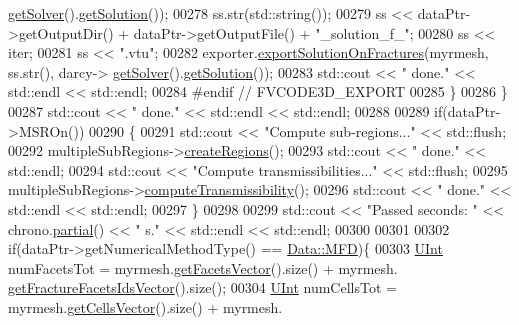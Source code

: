 \begin{DoxyCode}
      \hyperlink{classFVCode3D_1_1Problem_a39e64d24161ea699046d4e670fbc4eab}{getSolver}().\hyperlink{classFVCode3D_1_1Solver_a461d049e52ffc237cce3447c82860d3c}{getSolution}());
00278             ss.str(std::string());
00279             ss << dataPtr->getOutputDir() + dataPtr->getOutputFile() + \textcolor{stringliteral}{"\_solution\_f\_"};
00280             ss << iter;
00281             ss << \textcolor{stringliteral}{".vtu"};
00282             exporter.\hyperlink{classFVCode3D_1_1ExporterVTU_abc88a5113c02b55942862ef39b30ec80}{exportSolutionOnFractures}(myrmesh, ss.str(), darcy->
      \hyperlink{classFVCode3D_1_1Problem_a39e64d24161ea699046d4e670fbc4eab}{getSolver}().\hyperlink{classFVCode3D_1_1Solver_a461d049e52ffc237cce3447c82860d3c}{getSolution}());
00283             std::cout << \textcolor{stringliteral}{"  done."} << std::endl << std::endl;
00284 \textcolor{preprocessor}{#endif // FVCODE3D\_EXPORT}
00285         \}
00286     \}
00287     std::cout << \textcolor{stringliteral}{" done."} << std::endl << std::endl;
00288 
00289     \textcolor{keywordflow}{if}(dataPtr->MSROn())
00290     \{
00291         std::cout << \textcolor{stringliteral}{"Compute sub-regions..."} << std::flush;
00292         multipleSubRegions->\hyperlink{classFVCode3D_1_1MSR_af28b461584648e7d01bc515944ff42e8}{createRegions}();
00293         std::cout << \textcolor{stringliteral}{" done."} << std::endl;
00294         std::cout << \textcolor{stringliteral}{"Compute transmissibilities..."} << std::flush;
00295         multipleSubRegions->\hyperlink{classFVCode3D_1_1MSR_a86a998e349b36dbbef9300b15653afc2}{computeTransmissibility}();
00296         std::cout << \textcolor{stringliteral}{" done."} << std::endl << std::endl;
00297     \}
00298 
00299     std::cout << \textcolor{stringliteral}{"Passed seconds: "} << chrono.\hyperlink{classFVCode3D_1_1Chrono_a245a0c47da85e80de56e85d3689b925b}{partial}() << \textcolor{stringliteral}{" s."} << std::endl << std::endl;
00300     
00301     
00302     \textcolor{keywordflow}{if}(dataPtr->getNumericalMethodType() == \hyperlink{classFVCode3D_1_1Data_a5222e1901276af4586befd821445c6cfacf4497fa0025d2f6ea6a9b682e384ff3}{Data::MFD})\{
00303                 \hyperlink{namespaceFVCode3D_a4bf7e328c75d0fd504050d040ebe9eda}{UInt} numFacetsTot   = myrmesh.\hyperlink{classFVCode3D_1_1Rigid__Mesh_a6d3cdd4ef8a5225599953179d5302636}{getFacetsVector}().size() + myrmesh.
      \hyperlink{classFVCode3D_1_1Rigid__Mesh_aadbe6d9ad704122537903396d91238e0}{getFractureFacetsIdsVector}().size();
00304                 \hyperlink{namespaceFVCode3D_a4bf7e328c75d0fd504050d040ebe9eda}{UInt} numCellsTot    = myrmesh.\hyperlink{classFVCode3D_1_1Rigid__Mesh_afefb62f2c37317402b495e2369ed495b}{getCellsVector}().size() + myrmesh.

\end{DoxyCode}
